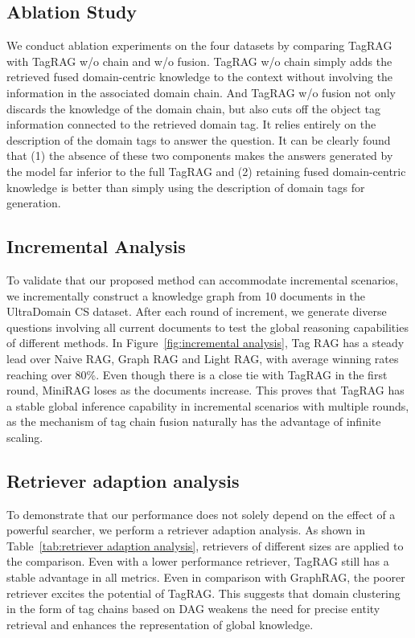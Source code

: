 \documentclass[11pt]{article}
\begin{document}
\subsection{Ablation Study}
We conduct ablation experiments on the four datasets by comparing TagRAG with TagRAG w/o chain and w/o fusion. 
TagRAG w/o chain simply adds the retrieved fused domain-centric knowledge to the context without involving the information in the associated domain chain.
And TagRAG w/o fusion not only discards the knowledge of the domain chain, but also cuts off the object tag information connected to the retrieved domain tag. It relies entirely on the description of the domain tags to answer the question.
It can be clearly found that (1) the absence of these two components makes the answers generated by the model far inferior to the full TagRAG and (2) retaining fused domain-centric knowledge is better than simply using the description of domain tags for generation.





\subsection{Incremental Analysis}
To validate that our proposed method can accommodate incremental scenarios, we incrementally construct a knowledge graph from 10 documents in the UltraDomain CS dataset. After each round of increment, we generate diverse questions involving all current documents to test the global reasoning capabilities of different methods.
In Figure~\ref{fig:incremental analysis}, Tag RAG has a steady lead over Naive RAG, Graph RAG and Light RAG, with average winning rates reaching over 80\%.
Even though there is a close tie with TagRAG in the first round, MiniRAG loses as the documents increase.
This proves that TagRAG has a stable global inference capability in incremental scenarios with multiple rounds, as the mechanism of tag chain fusion naturally has the advantage of infinite scaling.



\subsection{Retriever adaption analysis}

To demonstrate that our performance does not solely depend on the effect of a powerful searcher, we perform a retriever adaption analysis.
As shown in Table~\ref{tab:retriever adaption analysis}, retrievers of different sizes are applied to the comparison.
Even with a lower performance retriever, TagRAG still has a stable advantage in all metrics. Even in comparison with GraphRAG, the poorer retriever excites the potential of TagRAG.
This suggests that domain clustering in the form of tag chains based on DAG weakens the need for precise entity retrieval and enhances the representation of global knowledge.
\end{document}

